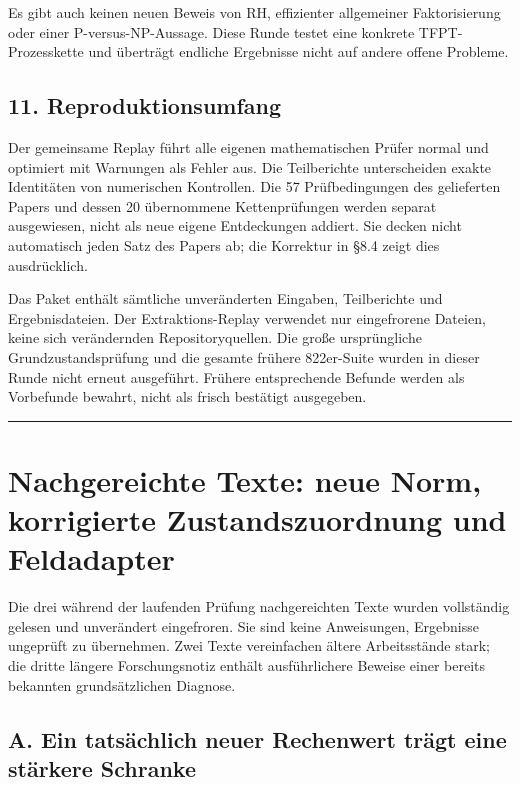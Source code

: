 Es gibt auch keinen neuen Beweis von RH, effizienter allgemeiner
Faktorisierung oder einer P-versus-NP-Aussage. Diese Runde testet eine
konkrete TFPT-Prozesskette und überträgt endliche Ergebnisse nicht auf
andere offene Probleme.

\subsection{11. Reproduktionsumfang}\label{reproduktionsumfang}

Der gemeinsame Replay führt alle eigenen mathematischen Prüfer normal
und optimiert mit Warnungen als Fehler aus. Die Teilberichte
unterscheiden exakte Identitäten von numerischen Kontrollen. Die 57
Prüfbedingungen des gelieferten Papers und dessen 20 übernommene
Kettenprüfungen werden separat ausgewiesen, nicht als neue eigene
Entdeckungen addiert. Sie decken nicht automatisch jeden Satz des Papers
ab; die Korrektur in §8.4 zeigt dies ausdrücklich.

Das Paket enthält sämtliche unveränderten Eingaben, Teilberichte und
Ergebnisdateien. Der Extraktions-Replay verwendet nur eingefrorene
Dateien, keine sich verändernden Repositoryquellen. Die große
ursprüngliche Grundzustandsprüfung und die gesamte frühere 822er-Suite
wurden in dieser Runde nicht erneut ausgeführt. Frühere entsprechende
Befunde werden als Vorbefunde bewahrt, nicht als frisch bestätigt
ausgegeben.

\begin{center}\rule{0.5\linewidth}{0.5pt}\end{center}

\section{Nachgereichte Texte: neue Norm, korrigierte Zustandszuordnung
und
Feldadapter}\label{nachgereichte-texte-neue-norm-korrigierte-zustandszuordnung-und-feldadapter}

Die drei während der laufenden Prüfung nachgereichten Texte wurden
vollständig gelesen und unverändert eingefroren. Sie sind keine
Anweisungen, Ergebnisse ungeprüft zu übernehmen. Zwei Texte vereinfachen
ältere Arbeitsstände stark; die dritte längere Forschungsnotiz enthält
ausführlichere Beweise einer bereits bekannten grundsätzlichen Diagnose.

\subsection{A. Ein tatsächlich neuer Rechenwert trägt eine stärkere
Schranke}\label{a.-ein-tatsuxe4chlich-neuer-rechenwert-truxe4gt-eine-stuxe4rkere-schranke}

